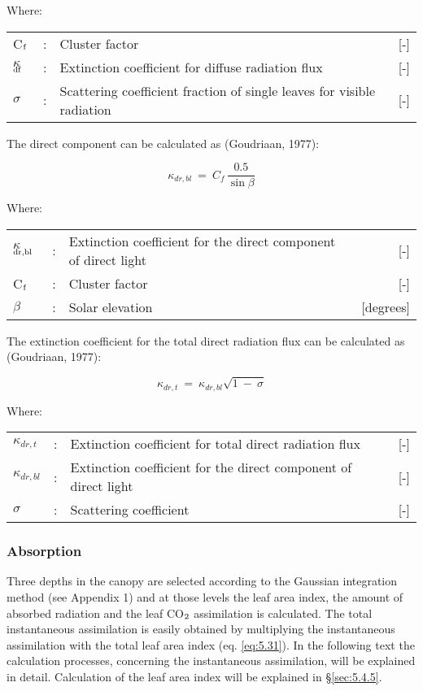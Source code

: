 Where:\\[5pt]
\begin{tabularx}{\textwidth}{llXr}
C$_{{\rm f}}$ &:& Cluster factor    &    [-]\\
$\kappa$$_{{\rm df}}$ &:& Extinction coefficient for diffuse radiation flux   &     [-]\\
$\sigma$ &:& Scattering coefficient fraction of single leaves for
   visible radiation  &      [-]\\
\end{tabularx}

The direct component can be calculated as (Goudriaan, 1977):

\begin{equation}
\label{eq:5.17}
\kappa _{dr,bl} ~=~{ C _{f} }\,{\frac{0.5}{\sin \beta }}
\end{equation}

Where:\\[5pt]
\begin{tabularx}{\textwidth}{llXr}
$\kappa$$_{{\rm dr,bl}}$ &:& Extinction coefficient for the direct component of direct light   &     [-] \\
C$_{{\rm f}}$ &:& Cluster factor     &   [-]\\
$\beta$ &:& Solar elevation     &   [degrees]\\
\end{tabularx}

The extinction coefficient for the total direct radiation flux can be calculated as (Goudriaan, 1977):

\begin{equation}
\label{eq:5.18}
\kappa _{dr,t} ~=~ \kappa _{dr,bl} \sqrt{1~-~\sigma }
\end{equation}

Where:\\[5pt]
\begin{tabularx}{\textwidth}{llXr}
$\kappa_{dr,t}$ &:& Extinction coefficient for total direct radiation flux   &    [-]\\
$\kappa_{dr,bl}$ &:& Extinction coefficient for the direct component of direct light  &   [-]\\
$\sigma$ &:& Scattering coefficient     &    [-]\\
\end{tabularx}

\subsubsection{Absorption}
Three depths in the canopy are selected according to the Gaussian integration method (see
Appendix 1) and at those levels the leaf area index, the amount of absorbed radiation and
the leaf CO$_{{\rm 2}}$ assimilation is calculated. The total instantaneous assimilation is easily
obtained by multiplying the instantaneous assimilation with the total leaf area index (eq.
\ref{eq:5.31}). In the following text the calculation processes, concerning the instantaneous
assimilation, will be explained in detail. Calculation of the leaf area index will be
explained in \S \ref{sec:5.4.5}.

